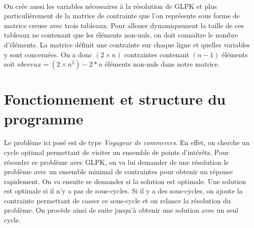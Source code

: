 \documentclass[a4paper,12pt]{article}
\begin{document}
\paragraph{}{
    On crée aussi les variables nécessaires à la résolution de GLPK et plus particulièrement de la matrice de contrainte que l'on représente sous forme de matrice creuse avec trois tableaux. Pour allouer dynamiquement la taille de ces tableaux ne contenant que les éléments non-nuls, on doit connaître le nombre d'éléments.
    La matrice définit une contrainte sur chaque ligne et quelles variables y sont concernées. On a donc $(2 \times n)$ contraintes contenant $(n-1)$ éléments soit $nbcreux = (2 \times n^2)-2*n$ éléments non-nuls dans notre matrice.
}

\section{Fonctionnement et structure du programme}

\paragraph{}{
    Le problème ici posé est de type \textit{Voyageur de commerces}. En effet, on cherche un cycle optimal permettant de visiter un ensemble de points d'intérêts. Pour résoudre ce problème avec GLPK, on va lui demander de une résolution le problème avec un ensemble minimal de contraintes pour obtenir un réponse rapidement. On va ensuite se demander si la solution est optimale. Une solution est optimale si il n'y a pas de sous-cycles. Si il y a des sous-cycles, on ajoute la contrainte permettant de casser ce sous-cycle et on relance la résolution du problème. On procède ainsi de suite jusqu'à obtenir une solution avec un seul cycle.
}
\end{document}
